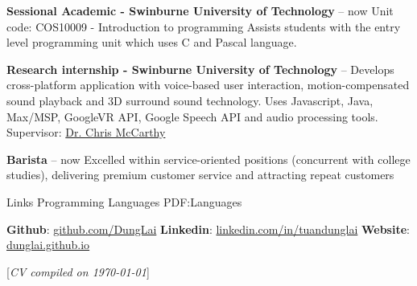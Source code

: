 \documentclass[letterpaper,MMMyyyy,nonstopmode]{simpleresumecv}
\newcommand{\CVNote}{CV compiled on {\today}}
\begin{document}
\begin{Body}
\BulletItem
\textbf{Sessional Academic - Swinburne University of Technology}
\hfill
{} -- now
\SubBulletItem Unit code: COS10009 - Introduction to programming
\SubBulletItem Assists students with the entry level programming unit which uses C and Pascal language.

\BulletItem
\textbf{Research internship - Swinburne University of Technology}
\hfill
{} --
\SubBulletItem Develops cross-platform application with voice-based user interaction, motion-compensated sound playback and 3D surround sound technology.
\SubBulletItem Uses Javascript, Java, Max/MSP, GoogleVR API, Google Speech API and audio processing tools.
\SubBulletItem Supervisor: \href{https://www.swinburne.edu.au/science-engineering-technology/staff/profile/index.php?id=cdmccarthy}{\color{blue}Dr. Chris McCarthy}

\BulletItem
\textbf{Barista}
\hfill
{} --
now
\SubBulletItem Excelled within service-oriented positions (concurrent with college studies), delivering premium customer service and attracting repeat customers

\Section 
{Links}
{Programming Languages}
{PDF:Languages}

\BulletItem \textbf{Github}: \href{https://github.com/DungLai}{\color{blue}github.com/DungLai}
\BulletItem \textbf{Linkedin}: \href{https://www.linkedin.com/in/tuandunglai/}{\color{blue}linkedin.com/in/tuandunglai}
\BulletItem \textbf{Website}: \href{https://dunglai.github.io/}{\color{blue}dunglai.github.io}
\end{Body}



\BigGap
\UseNoteFont%
\null\hfill%
[\textit{\CVNote}]
\end{document}
